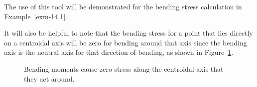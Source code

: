\documentclass[
  letterpaper,
  DIV=11,
  numbers=noendperiod]{scrreprt}
\theoremstyle{definition}
\theoremstyle{remark}
\begin{document}
The use of this tool will be demonstrated for the bending stress
calculation in Example~\ref{exm-14.1}.

It will also be helpful to note that the bending stress for a point that
lies directly on a centroidal axis will be zero for bending around that
axis since the bending axis is the neutral axis for that direction of
bending, as shown in Figure~\ref{fig-14.5}.

\begin{figure}


\caption{\label{fig-14.5}Bending moments cause zero stress along the
centroidal axis that they act around.}

\end{figure}%
\end{document}
